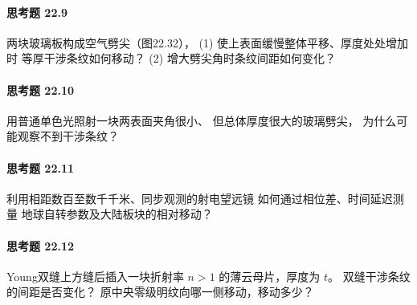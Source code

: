\paragraph{思考题 22.9}
两块玻璃板构成空气劈尖（图22.32），
(1) 使上表面缓慢整体平移、厚度处处增加时
等厚干涉条纹如何移动？
(2) 增大劈尖角时条纹间距如何变化？
\paragraph{思考题 22.10}
用普通单色光照射一块两表面夹角很小、
但总体厚度很大的玻璃劈尖，
为什么可能观察不到干涉条纹？
\paragraph{思考题 22.11}
利用相距数百至数千千米、同步观测的射电望远镜
如何通过相位差、时间延迟测量
地球自转参数及大陆板块的相对移动？
\paragraph{思考题 22.12}
Young双缝上方缝后插入一块折射率 \(n>1\)
的薄云母片，厚度为 \(t\)。
双缝干涉条纹的间距是否变化？
原中央零级明纹向哪一侧移动，移动多少？
